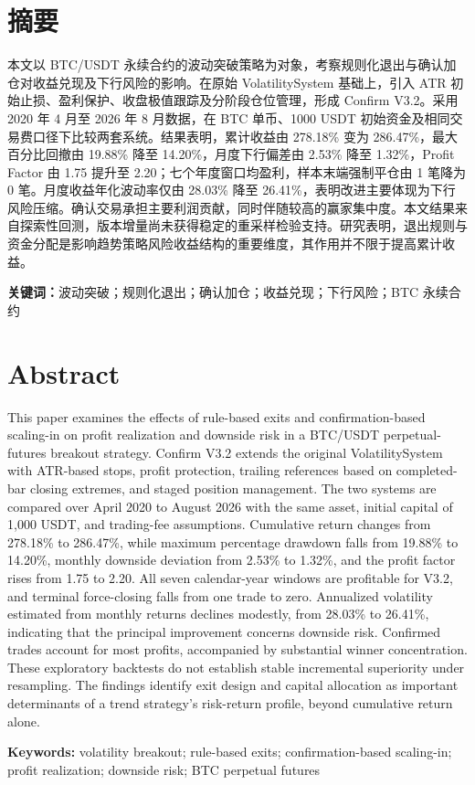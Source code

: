 \section*{摘\quad 要}

本文以 BTC/USDT 永续合约的波动突破策略为对象，考察规则化退出与确认加仓对收益兑现及下行风险的影响。在原始 VolatilitySystem 基础上，引入 ATR 初始止损、盈利保护、收盘极值跟踪及分阶段仓位管理，形成 Confirm V3.2。采用 2020 年 4 月至 2026 年 8 月数据，在 BTC 单币、1000 USDT 初始资金及相同交易费口径下比较两套系统。结果表明，累计收益由 278.18\% 变为 286.47\%，最大百分比回撤由 19.88\% 降至 14.20\%，月度下行偏差由 2.53\% 降至 1.32\%，Profit Factor 由 1.75 提升至 2.20；七个年度窗口均盈利，样本末端强制平仓由 1 笔降为 0 笔。月度收益年化波动率仅由 28.03\% 降至 26.41\%，表明改进主要体现为下行风险压缩。确认交易承担主要利润贡献，同时伴随较高的赢家集中度。本文结果来自探索性回测，版本增量尚未获得稳定的重采样检验支持。研究表明，退出规则与资金分配是影响趋势策略风险收益结构的重要维度，其作用并不限于提高累计收益。

\noindent\textbf{关键词：}波动突破；规则化退出；确认加仓；收益兑现；下行风险；BTC 永续合约

\vspace{1.2em}
\section*{Abstract}

This paper examines the effects of rule-based exits and confirmation-based scaling-in on profit realization and downside risk in a BTC/USDT perpetual-futures breakout strategy. Confirm V3.2 extends the original VolatilitySystem with ATR-based stops, profit protection, trailing references based on completed-bar closing extremes, and staged position management. The two systems are compared over April 2020 to August 2026 with the same asset, initial capital of 1,000 USDT, and trading-fee assumptions. Cumulative return changes from 278.18\% to 286.47\%, while maximum percentage drawdown falls from 19.88\% to 14.20\%, monthly downside deviation from 2.53\% to 1.32\%, and the profit factor rises from 1.75 to 2.20. All seven calendar-year windows are profitable for V3.2, and terminal force-closing falls from one trade to zero. Annualized volatility estimated from monthly returns declines modestly, from 28.03\% to 26.41\%, indicating that the principal improvement concerns downside risk. Confirmed trades account for most profits, accompanied by substantial winner concentration. These exploratory backtests do not establish stable incremental superiority under resampling. The findings identify exit design and capital allocation as important determinants of a trend strategy's risk-return profile, beyond cumulative return alone.

\noindent\textbf{Keywords:} volatility breakout; rule-based exits; confirmation-based scaling-in; profit realization; downside risk; BTC perpetual futures

\clearpage
